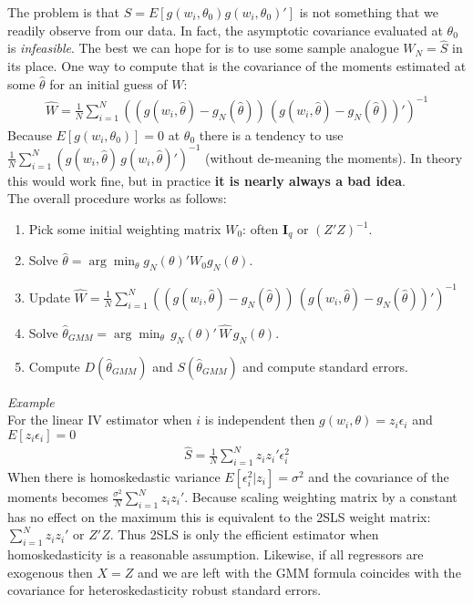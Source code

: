 \documentclass[a4paper]{article}
\begin{document}
The problem is that $S = E[g(w_i,\theta_0) g(w_i,\theta_0)']$ is not something that we readily observe from our data. In fact, the asymptotic covariance evaluated at $\theta_0$ is \textit{infeasible}. The best we can hope for is to use some sample analogue $W_N=\hat{S}$ in its place. One way to compute that is the covariance of the moments estimated at some $\hat{\theta}$ for an initial guess of $W$:
\begin{eqnarray*}
\hat{W} = \frac{1}{N} \sum_{i=1}^N \left((g(w_i,\hat{\theta}) - g_N(\hat{\theta}))  \, (g(w_i,\hat{\theta}) - g_N(\hat{\theta}))'\right)^{-1}
\end{eqnarray*}
Because $E[g(w_i,\theta_0)]=0$ at $\theta_0$ there is a tendency to use $\frac{1}{N} \sum_{i=1}^N \left(g(w_i,\hat{\theta}) \, g(w_i,\hat{\theta} )'\right)^{-1}$ (without de-meaning the moments). In theory this would work fine, but in practice \textbf{it is nearly always a bad idea}.\\

\noindent The overall procedure works as follows:
\begin{enumerate}
\item Pick some initial weighting matrix $W_0$: often $\mathbf{I}_q$ or $(Z'Z)^{-1}$.
\item Solve $\hat{\theta} = \arg \min_{\theta} g_N(\theta)' W_0  g_N(\theta)$.
\item Update $\hat{W} = \frac{1}{N} \sum_{i=1}^N \left((g(w_i,\hat{\theta}) - g_N(\hat{\theta}))  \, (g(w_i,\hat{\theta}) - g_N(\hat{\theta}))'\right)^{-1}$
\item Solve $\hat{\theta}_{GMM} = \arg \min_{\theta}\, g_N(\theta)' \, \hat{W} \, g_N(\theta)$.
\item Compute $D(\hat{\theta}_{GMM})$ and $S(\hat{\theta}_{GMM})$ and compute standard errors.
\end{enumerate}

\noindent \textit{Example}\\

For the linear IV estimator when $i$ is independent then $g(w_i,\theta) = z_i \epsilon_i$ and $E[z_i \epsilon_i]=0$
\begin{eqnarray*}
\hat{S}=\frac{1}{N} \sum_{i=1}^N z_i z_i' \epsilon_i^2
\end{eqnarray*}
When there is homoskedastic variance $E[\epsilon_i^2 | z_i] = \sigma^2$ and the covariance of the moments becomes $\frac{\sigma^2}{N} \sum_{i=1}^N z_i z_i'$. Because scaling weighting matrix by a constant has no effect on the maximum this is equivalent to the 2SLS weight matrix: $\sum_{i=1}^N z_i z_i'$ or $Z'Z$. Thus 2SLS is only the efficient estimator when homoskedasticity is a reasonable assumption. Likewise, if all regressors are exogenous then $X=Z$ and we are left with the GMM formula coincides with the covariance for heteroskedasticity robust standard errors.
\end{document}
